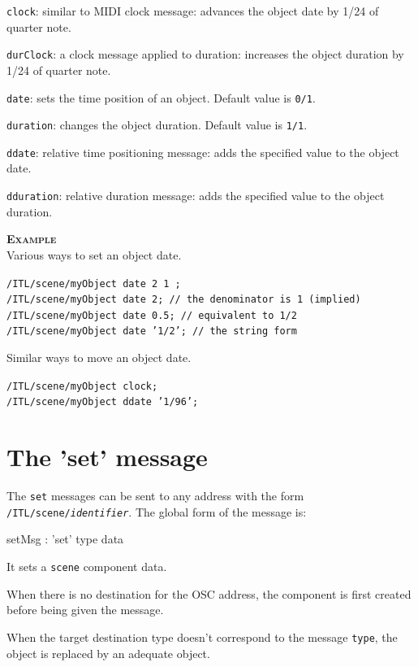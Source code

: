 \documentclass[a4paper,twoside]{report}
\newcommand{\toplevel}[1]	{\chapter{#1}}
\newcommand{\OSC}[1]		{\texttt{#1}}
\newcommand{\values}[1]		{\texttt{#1}}
\newcommand{\example}		{\textbf{\hspace{-1.5cm}\textbf{\textsc{Example }}}}
\let\olditemize\itemize
\let\oldenditemize\enditemize
\renewenvironment{itemize} 	{\olditemize \setlength{\itemsep}{1mm}}{\oldenditemize}
\newcommand{\sample}	[1]			{\vspace{-2mm}\begin{center}\colorbox{mygrey}{
								\begin{minipage}[t]{0.9\columnwidth} 
								{\small \texttt{#1}}
								\end{minipage}}\end{center}}
\begin{document}
\begin{itemize}
\item \OSC{clock}: similar to MIDI clock message: advances the object date by 1/24 of quarter note.
\item \OSC{durClock}: a clock message applied to duration: increases the object duration by 1/24 of quarter note.
\item \OSC{date}: sets the time position of an object. Default value is \values{0/1}.
\item \OSC{duration}: changes the object duration. Default value is \values{1/1}.
\item \OSC{ddate}: relative time positioning message: adds the specified value to the object date.
\item \OSC{dduration}: relative duration message: adds the specified value to the object duration.
\end{itemize}


\example \\
Various ways to set an object date.
\sample{/ITL/scene/myObject date 2 1 ;\\
/ITL/scene/myObject date 2;     \hspace{1.2cm}// the denominator is 1 (implied) \\
/ITL/scene/myObject date 0.5;   \hspace{7mm} // equivalent to 1/2 \\
/ITL/scene/myObject date '1/2'; \hspace{4mm} // the string form
}
Similar ways to move an object date.
\sample{/ITL/scene/myObject clock;   \\
/ITL/scene/myObject ddate '1/96';
}


\toplevel{The 'set' message}
\label{setsect}
The \OSC{set} messages can be sent to any address with the form \OSC{/ITL/scene/\textit{identifier}}. The global form of the message is:

\begin{rail}
setMsg : 'set' type data
\end{rail}

It sets a \OSC{scene} component data. 

When there is no destination for the OSC address, the component is first created before being given the message. 

When the target destination type doesn't correspond to the message \OSC{type}, the object is replaced by an adequate object.
\end{document}
